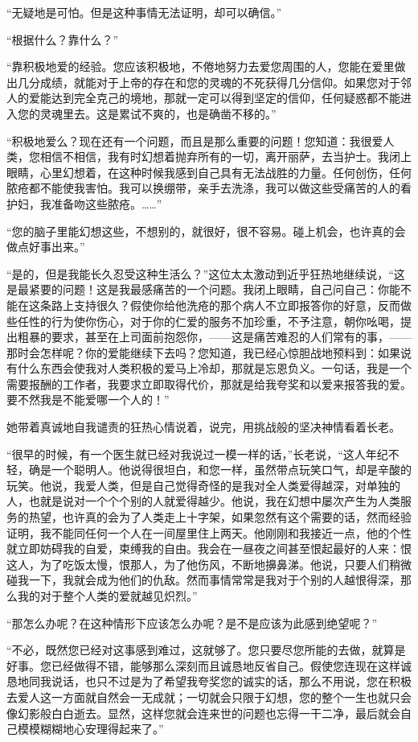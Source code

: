 \par “无疑地是可怕。但是这种事情无法证明，却可以确信。”
\par “根据什么？靠什么？”
\par “靠积极地爱的经验。您应该积极地，不倦地努力去爱您周围的人，您能在爱里做出几分成绩，就能对于上帝的存在和您的灵魂的不死获得几分信仰。如果您对于邻人的爱能达到完全克己的境地，那就一定可以得到坚定的信仰，任何疑惑都不能进入您的灵魂里去。这是累试不爽的，也是确凿不移的。”
\par “积极地爱么？现在还有一个问题，而且是那么重要的问题！您知道：我很爱人类，您相信不相信，我有时幻想着抛弃所有的一切，离开丽萨，去当护士。我闭上眼睛，心里幻想着，在这种时候我感到自己具有无法战胜的力量。任何创伤，任何脓疮都不能使我害怕。我可以换绷带，亲手去洗涤，我可以做这些受痛苦的人的看护妇，我准备吻这些脓疮。……”
\par “您的脑子里能幻想这些，不想别的，就很好，很不容易。碰上机会，也许真的会做点好事出来。”
\par “是的，但是我能长久忍受这种生活么？”这位太太激动到近乎狂热地继续说，“这是最紧要的问题！这是我最感痛苦的一个问题。我闭上眼睛，自己问自己：你能不能在这条路上支持很久？假使你给他洗疮的那个病人不立即报答你的好意，反而做些任性的行为使你伤心，对于你的仁爱的服务不加珍重，不予注意，朝你吆喝，提出粗暴的要求，甚至在上司面前抱怨你，——这是痛苦难忍的人们常有的事，——那时会怎样呢？你的爱能继续下去吗？您知道，我已经心惊胆战地预料到：如果说有什么东西会使我对人类积极的爱马上冷却，那就是忘恩负义。一句话，我是一个需要报酬的工作者，我要求立即取得代价，那就是给我夸奖和以爱来报答我的爱。要不然我是不能爱哪一个人的！”
\par 她带着真诚地自我谴责的狂热心情说着，说完，用挑战般的坚决神情看着长老。
\par “很早的时候，有一个医生就已经对我说过一模一样的话，”长老说，“这人年纪不轻，确是一个聪明人。他说得很坦白，和您一样，虽然带点玩笑口气，却是辛酸的玩笑。他说，我爱人类，但是自己觉得奇怪的是我对全人类爱得越深，对单独的人，也就是说对一个个个别的人就爱得越少。他说，我在幻想中屡次产生为人类服务的热望，也许真的会为了人类走上十字架，如果忽然有这个需要的话，然而经验证明，我不能同任何一个人在一间屋里住上两天。他刚刚和我接近一点，他的个性就立即妨碍我的自爱，束缚我的自由。我会在一昼夜之间甚至恨起最好的人来：恨这人，为了吃饭太慢，恨那人，为了他伤风，不断地擤鼻涕。他说，只要人们稍微碰我一下，我就会成为他们的仇敌。然而事情常常是我对于个别的人越恨得深，那么我的对于整个人类的爱就越见炽烈。”
\par “那怎么办呢？在这种情形下应该怎么办呢？是不是应该为此感到绝望呢？”
\par “不必，既然您已经对这事感到难过，这就够了。您只要尽您所能的去做，就算是好事。您已经做得不错，能够那么深刻而且诚恳地反省自己。假使您连现在这样诚恳地同我说话，也只不过是为了希望我夸奖您的诚实的话，那么不用说，您在积极去爱人这一方面就自然会一无成就；一切就会只限于幻想，您的整个一生也就只会像幻影般白白逝去。显然，这样您就会连来世的问题也忘得一干二净，最后就会自己模模糊糊地心安理得起来了。”
